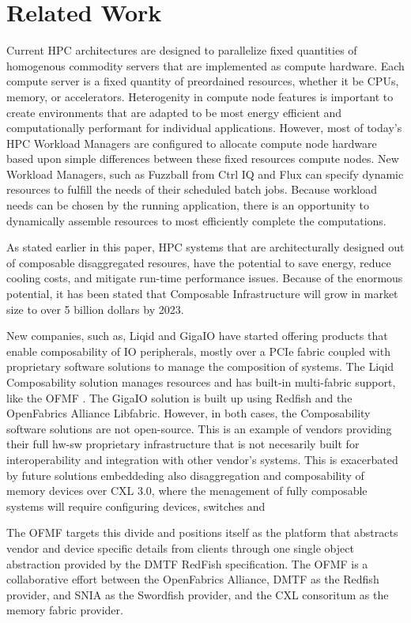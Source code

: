 \section{Related Work}
Current HPC architectures are designed to parallelize fixed quantities of homogenous commodity servers that are implemented as compute hardware.  Each compute server is a fixed quantity of preordained resources, whether it be CPUs, memory, or accelerators.  Heterogenity in compute node features is important to create environments that are adapted to be most energy efficient and computationally performant for individual applications.  However, most of today's HPC Workload Managers are configured to allocate compute node hardware based upon simple differences between these fixed resources compute nodes.  New Workload Managers, such as Fuzzball from Ctrl IQ \cite{fuzzball} and Flux \cite{flux} can specify dynamic resources to fulfill the needs of their scheduled batch jobs. Because workload needs can be chosen by the running application, there is an opportunity to dynamically assemble resources to most efficiently complete the computations.
 
As stated earlier in this paper, HPC systems that are architecturally designed out of composable disaggregated resoures, have the potential to save energy, reduce cooling costs, and mitigate run-time performance issues. Because of the enormous potential, it has been stated that Composable Infrastructure will grow in market size to over 5 billion dollars by 2023\cite{rlinker}.

New companies, such as, Liqid \cite{liqid} and GigaIO \cite{gigaio}  have started offering products that enable composability of IO peripherals, mostly over a PCIe fabric coupled with proprietary software solutions to manage the composition of systems. The Liqid Composability solution manages resources and has built-in multi-fabric support, like the OFMF \cite{liqidmf}. The GigaIO solution is built up using Redfish and the OpenFabrics Alliance Libfabric.  However, in both cases, the Composability software solutions are not open-source. This is an example of vendors providing their full hw-sw proprietary infrastructure that is not necesarily built for interoperability and integration with other vendor's systems. This is exacerbated by future solutions embeddeding also disaggregation and composability of memory devices over CXL 3.0, where the menagement of fully composable systems will require configuring devices, switches and 

The OFMF targets this divide and positions itself as the platform that abstracts vendor and device specific details from clients through one single object abstraction provided by the DMTF RedFish specification. The OFMF is a collaborative effort between the OpenFabrics Alliance, DMTF as the Redfish provider, and SNIA as the Swordfish provider, and the CXL consoritum as the memory fabric provider.








 
